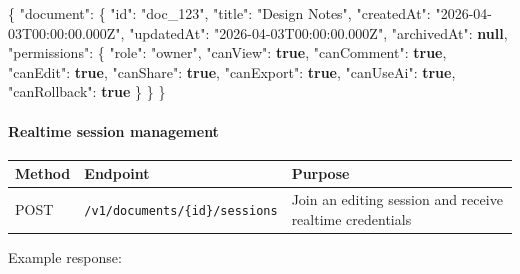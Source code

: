 \documentclass[a4paper]{article}
\newenvironment{Shaded}{}{}
\newcommand{\DataTypeTok}[1]{\textcolor[rgb]{0.56,0.13,0.00}{#1}}
\newcommand{\FunctionTok}[1]{\textcolor[rgb]{0.02,0.16,0.49}{#1}}
\newcommand{\KeywordTok}[1]{\textcolor[rgb]{0.00,0.44,0.13}{\textbf{#1}}}
\newcommand{\StringTok}[1]{\textcolor[rgb]{0.25,0.44,0.63}{#1}}
\begin{document}
\begin{Shaded}
\begin{Highlighting}[]
\FunctionTok{\{}
  \DataTypeTok{"document"}\FunctionTok{:} \FunctionTok{\{}
    \DataTypeTok{"id"}\FunctionTok{:} \StringTok{"doc\_123"}\FunctionTok{,}
    \DataTypeTok{"title"}\FunctionTok{:} \StringTok{"Design Notes"}\FunctionTok{,}
    \DataTypeTok{"createdAt"}\FunctionTok{:} \StringTok{"2026{-}04{-}03T00:00:00.000Z"}\FunctionTok{,}
    \DataTypeTok{"updatedAt"}\FunctionTok{:} \StringTok{"2026{-}04{-}03T00:00:00.000Z"}\FunctionTok{,}
    \DataTypeTok{"archivedAt"}\FunctionTok{:} \KeywordTok{null}\FunctionTok{,}
    \DataTypeTok{"permissions"}\FunctionTok{:} \FunctionTok{\{}
      \DataTypeTok{"role"}\FunctionTok{:} \StringTok{"owner"}\FunctionTok{,}
      \DataTypeTok{"canView"}\FunctionTok{:} \KeywordTok{true}\FunctionTok{,}
      \DataTypeTok{"canComment"}\FunctionTok{:} \KeywordTok{true}\FunctionTok{,}
      \DataTypeTok{"canEdit"}\FunctionTok{:} \KeywordTok{true}\FunctionTok{,}
      \DataTypeTok{"canShare"}\FunctionTok{:} \KeywordTok{true}\FunctionTok{,}
      \DataTypeTok{"canExport"}\FunctionTok{:} \KeywordTok{true}\FunctionTok{,}
      \DataTypeTok{"canUseAi"}\FunctionTok{:} \KeywordTok{true}\FunctionTok{,}
      \DataTypeTok{"canRollback"}\FunctionTok{:} \KeywordTok{true}
    \FunctionTok{\}}
  \FunctionTok{\}}
\FunctionTok{\}}
\end{Highlighting}
\end{Shaded}

\paragraph{Realtime session
management}\label{realtime-session-management}

\begin{table}[h]
\small
\begin{tabularx}{\textwidth}{@{}L{14mm}L{54mm}Y@{}}
\toprule
Method & Endpoint & Purpose \\
\midrule
POST & \texttt{/v1/documents/\{id\}/sessions} & Join an editing session and receive realtime credentials \\
\bottomrule
\end{tabularx}
\end{table}

Example response:
\end{document}
